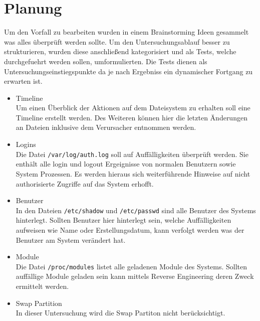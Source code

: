 \section{Planung}
Um den Vorfall zu bearbeiten wurden in einem Brainstorming Ideen gesammelt was alles überprüft werden sollte. Um den Untersuchungsablauf besser zu strukturieren, wurden diese anschließend kategorisiert und als Tests, welche durchgefuehrt werden sollen, umformulierten. Die Tests dienen als Untersuchungseinstiegspunkte da je nach Ergebniss ein dynamischer Fortgang zu erwarten ist.

\begin{itemize}
\item Timeline\\
Um einen Überblick der Aktionen auf dem Dateisystem zu erhalten soll eine Timeline erstellt werden.
Des Weiteren können hier die letzten Änderungen an Dateien inklusive dem Verursacher entnommen werden.

\item Logins\\
Die Datei \texttt{/var/log/auth.log} soll auf Auffälligkeiten überprüft werden. Sie enthält alle login und logout Ergeignisse von normalen Benutzern sowie System Prozessen. 
Es werden hieraus sich weiterführende Hinweise auf nicht authorisierte Zugriffe auf das System erhofft.

\item Benutzer\\
In den Dateien \texttt{/etc/shadow} und \texttt{/etc/passwd} sind alle Benutzer des Systems hinterlegt. Sollten Benutzer hier hinterlegt sein, welche Auffälligkeiten aufweisen wie Name oder Erstellungsdatum, kann verfolgt werden was der Benutzer am System verändert hat.

\item Module\\
Die Datei \texttt{/proc/modules} listet alle geladenen Module des Systems. Sollten auffällige Module geladen sein kann mittels Reverse Engineering deren Zweck ermittelt werden.

\item Swap Partition\\
In dieser Untersuchung wird die Swap Partiton nicht berücksichtigt.
\end{itemize}